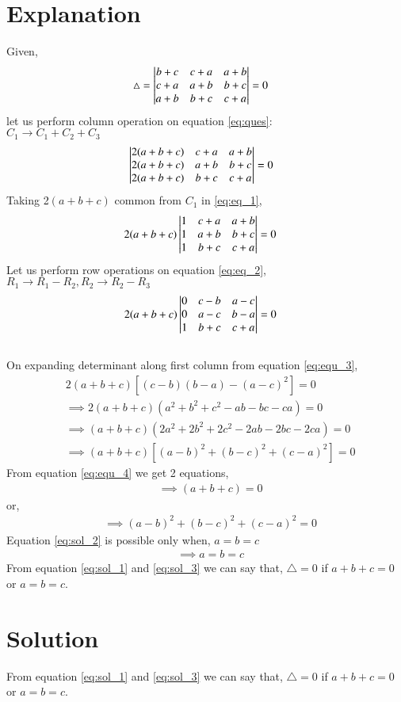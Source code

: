\documentclass[journal,12pt,twocolumn]{IEEEtran}
\begin{document}
\section{Explanation}
Given,\\
\begin{align}
&\triangle = \begin{vmatrix}b+c & c+a & a+b\\c+a & a+b & b+c\\a+b&b+c & c+a\end{vmatrix} =0\label{eq:ques}
\end{align}
let us perform column operation on equation \eqref{eq:ques}:\\
$C_1 \rightarrow C_1+C_2+C_3$
\begin{align}
&\begin{vmatrix}2(a+b+c) & c+a & a+b\\2(a+b+c) & a+b & b+c\\2(a+b+c)&b+c & c+a\end{vmatrix} =0 \label{eq:eq_1}
\end{align}
Taking 2$(a+b+c)$ common from $C_1$ in \eqref{eq:eq_1},\\
\begin{align}
&2(a+b+c)\begin{vmatrix}1 & c+a & a+b\\1 & a+b & b+c\\1&b+c & c+a\end{vmatrix} =0 \label{eq:eq_2}
\end{align}
Let us  perform row operations on equation \eqref{eq:eq_2},
$R_1 \rightarrow R_1-R_2, R_2 \rightarrow R_2-R_3$
\begin{align}
&2(a+b+c)\begin{vmatrix}0 & c-b & a-c\\0 & a-c & b-a\\1&b+c & c+a\end{vmatrix} =0 \label{eq:equ_3}
\end{align}\\
On expanding determinant along first column from equation \eqref{eq:equ_3},
\begin{align}
&2(a+b+c)[(c-b)(b-a)-(a-c)^{2}]=0\\
&\implies 2(a+b+c)(a^{2}+b^{2}+c^{2}-ab-bc-ca)=0 \\
&\implies (a+b+c)(2a^{2}+2b^{2}+2c^{2}-2ab-2bc-2ca)=0\\
&\implies (a+b+c)[(a-b)^{2}+(b-c)^{2}+(c-a)^{2}] = 0 \label{eq:equ_4}
\end{align}
From equation \eqref{eq:equ_4} we get 2 equations,
\begin{align}
&\implies \boxed{(a+b+c) = 0} \label{eq:sol_1}
\end{align}
or,
\begin{align}
&\implies (a-b)^{2}+(b-c)^{2}+(c-a)^{2} = 0 \label{eq:sol_2}
\end{align}
Equation \eqref{eq:sol_2} is possible only when, $a=b=c$
\begin{align}
&\implies \boxed{a=b=c} \label{eq:sol_3}
\end{align}
From equation \eqref{eq:sol_1} and \eqref{eq:sol_3} we can say that,
$\triangle=0$ if $a+b+c=0$ or $a=b=c$.
\section{Solution}

From equation \eqref{eq:sol_1} and \eqref{eq:sol_3} we can say that,
$\triangle=0$ if $a+b+c=0$ or $a=b=c$.

\\
\end{document}

